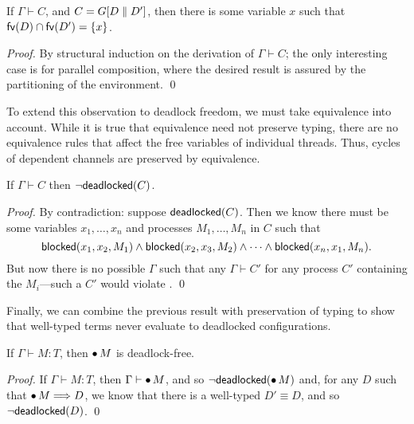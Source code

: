 \documentclass[oribibl,orivec,envcountsame]{llncs}
\begin{document}
\begin{lemma}\label{lem:procs-share-one-channel}
  If $\Gamma \vdash C$, and $C = G[D \parallel D']$, then there is some variable $x$ such that
  $\mathsf{fv}(D) \cap \mathsf{fv}(D') = \{ x \}$.
\end{lemma}

\begin{proof}
  By structural induction on the derivation of $\Gamma \vdash C$; the only interesting case is for
  parallel composition, where the desired result is assured by the partitioning of the
  environment. \qed
\end{proof}

To extend this observation to deadlock freedom, we must take equivalence into account.  While it is
true that equivalence need not preserve typing, there are no equivalence rules that affect the free
variables of individual threads.  Thus, cycles of dependent channels are preserved by equivalence.

\begin{lemma}\label{lem:typed-configs-df}
  If $\Gamma \vdash C$ then $\lnot \mathsf{deadlocked}(C)$.
\end{lemma}

\begin{proof}
  By contradiction: suppose $\mathsf{deadlocked}(C)$.  Then we know there must be some variables
  $x_1,\dots,x_n$ and processes $M_1,\dots,M_n$ in $C$ such that
  \[
    \mathsf{blocked}(x_1,x_2,M_1) \land \mathsf{blocked}(x_2,x_3,M_2) \land \cdots \land \mathsf{blocked}(x_n,x_1,M_n).
  \]
  But now there is no possible $\Gamma$ such that any $\Gamma \vdash C'$ for any process $C'$
  containing the $M_i$---such a $C'$ would violate .  \qed
\end{proof}

Finally, we can combine the previous result with preservation of typing to show that well-typed
terms never evaluate to deadlocked configurations.

\begin{theorem}\label{thm:typed-terms-df}
  If $\Gamma \vdash M: T$, then ${\mathord{\bullet}}\,M$ is deadlock-free.
\end{theorem}

\begin{proof}
  If $\Gamma \vdash M: T$, then $\Gamma \vdash {\mathord{\bullet}}\,M$, and so
  $\lnot\mathsf{deadlocked}({\mathord{\bullet}}\,M)$ and, for any $D$ such that ${\mathord{\bullet}}\,M \Longrightarrow D$, we
  know that there is a well-typed $D' \equiv D$, and so $\lnot\mathsf{deadlocked}(D)$. \qed
\end{proof}
\end{document}
